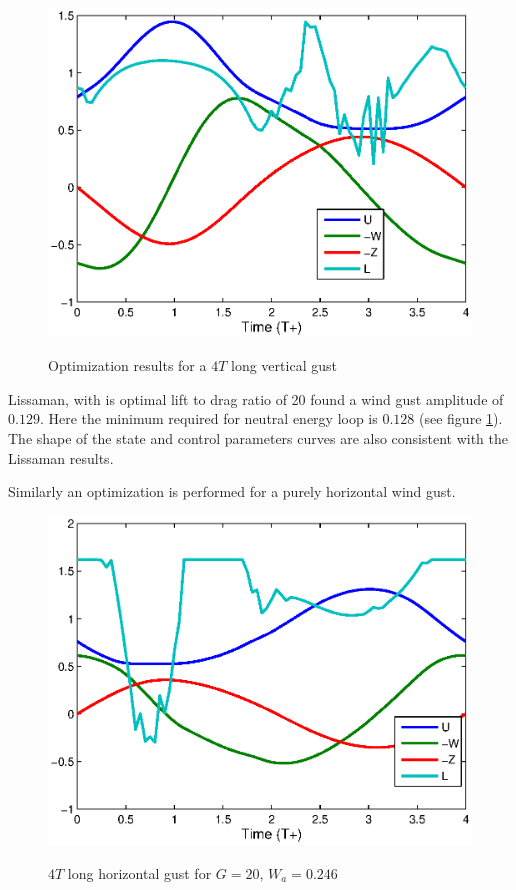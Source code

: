 \begin{figure}[ht]
  \begin{center}	
    \scalebox{1.0}
    {\includegraphics{./Figures/Windtype=1_Tg=4_Wg=0p129_quad_G=20.eps}}
  \end{center}
  \caption{Optimization results for a $4T$ long vertical gust}
  \label{fig:Validation_optimization}
\end{figure}

\FloatBarrier

Lissaman, with is optimal lift to drag ratio of 20 found a wind gust amplitude of $0.129$. 
Here the minimum required for neutral energy loop is $0.128$ (see figure \ref{fig:Validation_optimization}).
The shape of the state and control parameters curves are also consistent with the Lissaman results.

\par Similarly an optimization is performed for a purely horizontal wind gust.

\begin{figure}[h]
  \begin{center}
    \scalebox{1.0}
    {\includegraphics{./Figures/Windtype=2_Tg=4_Wg=0p246_quad_G=20.eps}}
  \end{center}
  \caption{$4T$ long horizontal gust for $G=20$, $W_a=0.246$}
  \label{fig:Horizontal_optimization}
\end{figure}

